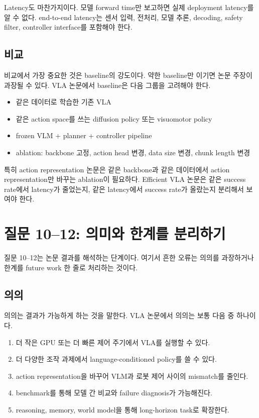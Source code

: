 Latency도 마찬가지이다. 모델 forward time만 보고하면 실제 deployment latency를 알 수 없다. end-to-end latency는 센서 입력, 전처리, 모델 추론, decoding, safety filter, controller interface를 포함해야 한다.

\subsection{비교}

비교에서 가장 중요한 것은 baseline의 강도이다. 약한 baseline만 이기면 논문 주장이 과장될 수 있다. VLA 논문에서 baseline은 다음 그룹을 고려해야 한다.

\begin{itemize}
  \item 같은 데이터로 학습한 기존 VLA
  \item 같은 action space를 쓰는 diffusion policy 또는 visuomotor policy
  \item frozen VLM + planner + controller pipeline
  \item ablation: backbone 고정, action head 변경, data size 변경, chunk length 변경
\end{itemize}

특히 action representation 논문은 같은 backbone과 같은 데이터에서 action representation만 바꾸는 ablation이 필요하다. Efficient VLA 논문은 같은 success rate에서 latency가 줄었는지, 같은 latency에서 success rate가 올랐는지 분리해서 보여야 한다.

\section{질문 10--12: 의미와 한계를 분리하기}

질문 10--12는 논문 결과를 해석하는 단계이다. 여기서 흔한 오류는 의의를 과장하거나 한계를 future work 한 줄로 처리하는 것이다.

\subsection{의의}

의의는 결과가 가능하게 하는 것을 말한다. VLA 논문에서 의의는 보통 다음 중 하나이다.

\begin{enumerate}
  \item 더 작은 GPU 또는 더 빠른 제어 주기에서 VLA를 실행할 수 있다.
  \item 더 다양한 조작 과제에서 language-conditioned policy를 쓸 수 있다.
  \item action representation을 바꾸어 VLM과 로봇 제어 사이의 mismatch를 줄인다.
  \item benchmark를 통해 모델 간 비교와 failure diagnosis가 가능해진다.
  \item reasoning, memory, world model을 통해 long-horizon task로 확장한다.
\end{enumerate}

